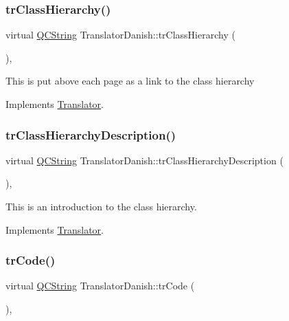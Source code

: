 \subsubsection{\texorpdfstring{trClassHierarchy()}{trClassHierarchy()}}
{\footnotesize\ttfamily virtual \mbox{\hyperlink{class_q_c_string}{Q\+C\+String}} Translator\+Danish\+::tr\+Class\+Hierarchy (\begin{DoxyParamCaption}{ }\end{DoxyParamCaption})\hspace{0.3cm}{\ttfamily [inline]}, {\ttfamily [virtual]}}

This is put above each page as a link to the class hierarchy 

Implements \mbox{\hyperlink{class_translator}{Translator}}.

\mbox{\label{class_translator_danish_a4ed302f6eb80e8ac4834c01d391e60c4}} 
\subsubsection{\texorpdfstring{trClassHierarchyDescription()}{trClassHierarchyDescription()}}
{\footnotesize\ttfamily virtual \mbox{\hyperlink{class_q_c_string}{Q\+C\+String}} Translator\+Danish\+::tr\+Class\+Hierarchy\+Description (\begin{DoxyParamCaption}{ }\end{DoxyParamCaption})\hspace{0.3cm}{\ttfamily [inline]}, {\ttfamily [virtual]}}

This is an introduction to the class hierarchy. 

Implements \mbox{\hyperlink{class_translator}{Translator}}.

\mbox{\label{class_translator_danish_af8115ac047c1111084180e5c870fec1b}} 
\subsubsection{\texorpdfstring{trCode()}{trCode()}}
{\footnotesize\ttfamily virtual \mbox{\hyperlink{class_q_c_string}{Q\+C\+String}} Translator\+Danish\+::tr\+Code (\begin{DoxyParamCaption}{ }\end{DoxyParamCaption})\hspace{0.3cm}{\ttfamily [inline]}, {\ttfamily [virtual]}}

